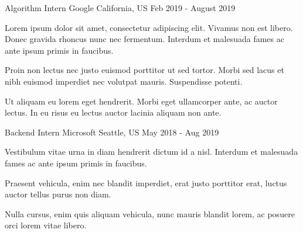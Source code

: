 

\begin{cventries}

  \cventry
    {Algorithm Intern} %
    {Google} %
    {California, US} %
    {Feb 2019 - August 2019} %
    {
      \begin{cvitems} %
        \item {Lorem ipsum dolor sit amet, consectetur adipiscing elit. Vivamus non est libero. Donec gravida rhoncus nunc nec fermentum. Interdum et malesuada fames ac ante ipsum primis in faucibus.}
        \item {Proin non lectus nec justo euismod porttitor ut sed tortor. Morbi sed lacus et nibh euismod imperdiet nec volutpat mauris. Suspendisse potenti.}
        \item {Ut aliquam eu lorem eget hendrerit. Morbi eget ullamcorper ante, ac auctor lectus. In eu risus eu lectus auctor lacinia aliquam non ante.}
      \end{cvitems}
    }

  \cventry
    {Backend Intern} %
    {Microsoft} %
    {Seattle, US} %
    {May 2018 - Aug 2019} %
    {
      \begin{cvitems} %
        \item {Vestibulum vitae urna in diam hendrerit dictum id a nisl. Interdum et malesuada fames ac ante ipsum primis in faucibus.}
        \item {Praesent vehicula, enim nec blandit imperdiet, erat justo porttitor erat, luctus auctor tellus purus non diam.}
        \item {Nulla cursus, enim quis aliquam vehicula, nunc mauris blandit lorem, ac posuere orci lorem vitae libero.}
      \end{cvitems}
    }
\end{cventries}
